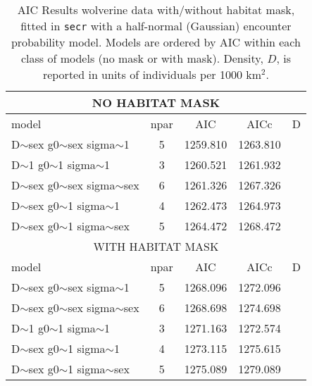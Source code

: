 \begin{table}[ht]
\centering
\caption{
AIC Results wolverine data with/without habitat mask, fitted
in \mbox{\tt secr} with a half-normal (Gaussian) encounter probability
model. Models are ordered by
AIC within each class of models (no mask or with mask).  Density, $D$, is
reported in units of individuals per 1000 km$^2$.
}
\begin{tabular}{lcccc}
\hline \hline
\multicolumn{5}{c}{NO HABITAT MASK} \\ \hline
  model & npar & AIC & AICc & D \\ \hline
D$\sim$sex g0$\sim$sex sigma$\sim$1    &    5&  1259.810& 1263.810 &\\
D$\sim$1 g0$\sim$1 sigma$\sim$1                &    3&  1260.521& 1261.932 & \\
D$\sim$sex g0$\sim$sex sigma$\sim$sex&  6&  1261.326& 1267.326 &\\
D$\sim$sex g0$\sim$1 sigma$\sim$1          &    4&  1262.473& 1264.973 &\\
D$\sim$sex g0$\sim$1 sigma$\sim$sex      &  5&  1264.472& 1268.472 &\\
\hline \hline
\multicolumn{5}{c}{WITH HABITAT MASK} \\ \hline
  model & npar & AIC & AICc & D \\ \hline
D$\sim$sex g0$\sim$sex sigma$\sim$1       &    5& 1268.096& 1272.096 & \\
D$\sim$sex g0$\sim$sex sigma$\sim$sex &    6& 1268.698& 1274.698 &\\
D$\sim$1       g0$\sim$1       sigma$\sim$1       &    3& 1271.163& 1272.574 &\\
D$\sim$sex g0$\sim$1       sigma$\sim$1       &    4& 1273.115& 1275.615 &\\
D$\sim$sex g0$\sim$1       sigma$\sim$sex &    5& 1275.089& 1279.089 &\\
\hline
\end{tabular}
\label{gof.tab.aic}
\end{table}


